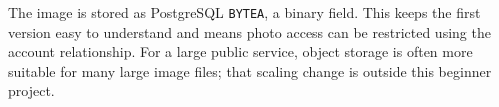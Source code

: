 The image is stored as PostgreSQL \texttt{BYTEA}, a binary field. This keeps the first version easy to understand and means photo access can be restricted using the account relationship. For a large public service, object storage is often more suitable for many large image files; that scaling change is outside this beginner project.
